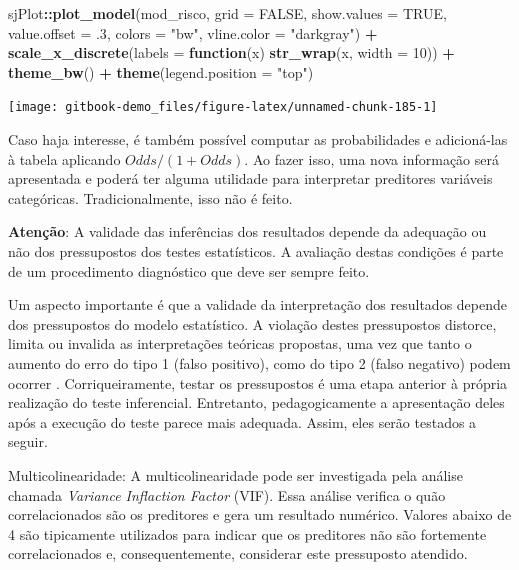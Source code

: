 \documentclass[
]{book}
\newenvironment{Shaded}{\begin{snugshade}}{\end{snugshade}}
\newcommand{\ControlFlowTok}[1]{\textcolor[rgb]{0.13,0.29,0.53}{\textbf{#1}}}
\newcommand{\DataTypeTok}[1]{\textcolor[rgb]{0.13,0.29,0.53}{#1}}
\newcommand{\DecValTok}[1]{\textcolor[rgb]{0.00,0.00,0.81}{#1}}
\newcommand{\FloatTok}[1]{\textcolor[rgb]{0.00,0.00,0.81}{#1}}
\newcommand{\KeywordTok}[1]{\textcolor[rgb]{0.13,0.29,0.53}{\textbf{#1}}}
\newcommand{\NormalTok}[1]{#1}
\newcommand{\OperatorTok}[1]{\textcolor[rgb]{0.81,0.36,0.00}{\textbf{#1}}}
\newcommand{\OtherTok}[1]{\textcolor[rgb]{0.56,0.35,0.01}{#1}}
\newcommand{\StringTok}[1]{\textcolor[rgb]{0.31,0.60,0.02}{#1}}
\begin{document}
\begin{Shaded}
\begin{Highlighting}[]
\NormalTok{sjPlot}\OperatorTok{::}\KeywordTok{plot_model}\NormalTok{(mod_risco,}
            \DataTypeTok{grid =} \OtherTok{FALSE}\NormalTok{, }
            \DataTypeTok{show.values =} \OtherTok{TRUE}\NormalTok{, }\DataTypeTok{value.offset =} \FloatTok{.3}\NormalTok{, }
            \DataTypeTok{colors =} \StringTok{"bw"}\NormalTok{,}
            \DataTypeTok{vline.color =} \StringTok{"darkgray"}\NormalTok{) }\OperatorTok{+}
\StringTok{  }\KeywordTok{scale_x_discrete}\NormalTok{(}\DataTypeTok{labels =} \ControlFlowTok{function}\NormalTok{(x) }\KeywordTok{str_wrap}\NormalTok{(x, }\DataTypeTok{width =} \DecValTok{10}\NormalTok{)) }\OperatorTok{+}
\StringTok{  }\KeywordTok{theme_bw}\NormalTok{() }\OperatorTok{+}
\StringTok{  }\KeywordTok{theme}\NormalTok{(}\DataTypeTok{legend.position =} \StringTok{"top"}\NormalTok{)}
\end{Highlighting}
\end{Shaded}

\begin{center}\texttt{[image: gitbook-demo\_files/figure-latex/unnamed-chunk-185-1]} \end{center}

Caso haja interesse, é também possível computar as probabilidades e adicioná-las à tabela aplicando \(Odds/(1+Odds)\). Ao fazer isso, uma nova informação será apresentada e poderá ter alguma utilidade para interpretar preditores variáveis categóricas. Tradicionalmente, isso não é feito.

\textbf{Atenção}: A validade das inferências dos resultados depende da adequação ou não dos pressupostos dos testes estatísticos. A avaliação destas condições é parte de um procedimento diagnóstico que deve ser sempre feito.

Um aspecto importante é que a validade da interpretação dos resultados depende dos pressupostos do modelo estatístico. A violação destes pressupostos distorce, limita ou invalida as interpretações teóricas propostas, uma vez que tanto o aumento do erro do tipo 1 (falso positivo), como do tipo 2 (falso negativo) podem ocorrer \citep{Lix1996, Barker2015, Ernst2017}. Corriqueiramente, testar os pressupostos é uma etapa anterior à própria realização do teste inferencial. Entretanto, pedagogicamente a apresentação deles após a execução do teste parece mais adequada. Assim, eles serão testados a seguir.

Multicolinearidade: A multicolinearidade pode ser investigada pela análise chamada \emph{Variance Inflaction Factor} (VIF). Essa análise verifica o quão correlacionados são os preditores e gera um resultado numérico. Valores abaixo de 4 são tipicamente utilizados para indicar que os preditores não são fortemente correlacionados e, consequentemente, considerar este pressuposto atendido.
\end{document}
